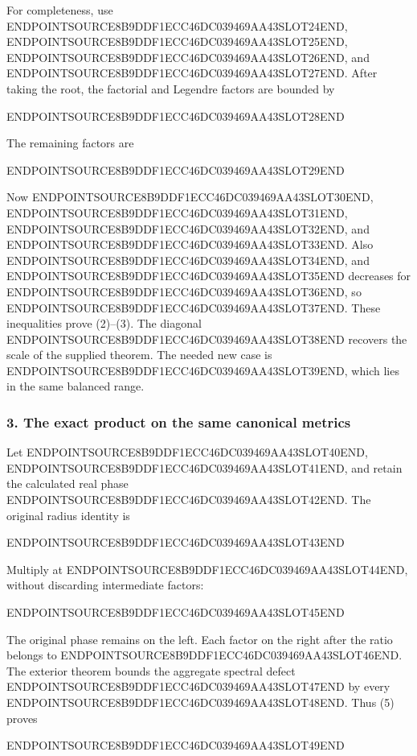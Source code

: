 For completeness, use ENDPOINTSOURCE8B9DDF1ECC46DC039469AA43SLOT24END, ENDPOINTSOURCE8B9DDF1ECC46DC039469AA43SLOT25END, ENDPOINTSOURCE8B9DDF1ECC46DC039469AA43SLOT26END, and ENDPOINTSOURCE8B9DDF1ECC46DC039469AA43SLOT27END. After taking the root, the factorial and Legendre factors are bounded by

ENDPOINTSOURCE8B9DDF1ECC46DC039469AA43SLOT28END

The remaining factors are

ENDPOINTSOURCE8B9DDF1ECC46DC039469AA43SLOT29END

Now ENDPOINTSOURCE8B9DDF1ECC46DC039469AA43SLOT30END, ENDPOINTSOURCE8B9DDF1ECC46DC039469AA43SLOT31END, ENDPOINTSOURCE8B9DDF1ECC46DC039469AA43SLOT32END, and ENDPOINTSOURCE8B9DDF1ECC46DC039469AA43SLOT33END. Also ENDPOINTSOURCE8B9DDF1ECC46DC039469AA43SLOT34END, and ENDPOINTSOURCE8B9DDF1ECC46DC039469AA43SLOT35END decreases for ENDPOINTSOURCE8B9DDF1ECC46DC039469AA43SLOT36END, so ENDPOINTSOURCE8B9DDF1ECC46DC039469AA43SLOT37END. These inequalities prove (2)--(3). The diagonal ENDPOINTSOURCE8B9DDF1ECC46DC039469AA43SLOT38END recovers the scale of the supplied theorem. The needed new case is ENDPOINTSOURCE8B9DDF1ECC46DC039469AA43SLOT39END, which lies in the same balanced range.

\subsubsection{3. The exact product on the same canonical metrics}\label{endpoint-four_volume_threshold--the-exact-product-on-the-same-canonical-metrics}

Let ENDPOINTSOURCE8B9DDF1ECC46DC039469AA43SLOT40END, ENDPOINTSOURCE8B9DDF1ECC46DC039469AA43SLOT41END, and retain the calculated real phase ENDPOINTSOURCE8B9DDF1ECC46DC039469AA43SLOT42END. The original radius identity is

ENDPOINTSOURCE8B9DDF1ECC46DC039469AA43SLOT43END

Multiply at ENDPOINTSOURCE8B9DDF1ECC46DC039469AA43SLOT44END, without discarding intermediate factors:

ENDPOINTSOURCE8B9DDF1ECC46DC039469AA43SLOT45END

The original phase remains on the left. Each factor on the right after the ratio belongs to ENDPOINTSOURCE8B9DDF1ECC46DC039469AA43SLOT46END. The exterior theorem bounds the aggregate spectral defect ENDPOINTSOURCE8B9DDF1ECC46DC039469AA43SLOT47END by every ENDPOINTSOURCE8B9DDF1ECC46DC039469AA43SLOT48END. Thus (5) proves

ENDPOINTSOURCE8B9DDF1ECC46DC039469AA43SLOT49END

